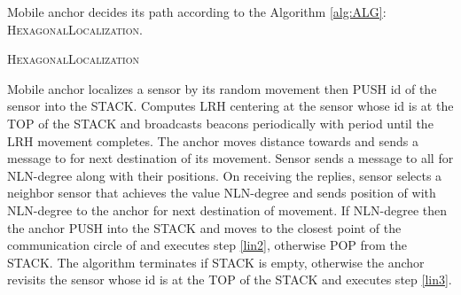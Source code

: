 \documentclass[preprint,11pt]{elsarticle}
\begin{document}
Mobile anchor decides its path according to the Algorithm \ref{alg:ALG}: \textsc{HexagonalLocalization}.
\begin{algorithm}[]
\caption{\textsc{HexagonalLocalization}}
\begin{algorithmic}[1]
                    \STATE Mobile anchor localizes a sensor by its random movement then PUSH id of the sensor into the STACK.
                    \STATE \label{lin2} Computes LRH centering at the sensor whose id  is at the TOP of the STACK and broadcasts beacons periodically with period  until the LRH movement completes.
                    \STATE \label{lin3} The anchor moves  distance towards  and sends a message to  for next destination of its movement.
                    \STATE Sensor  sends a message to all  for NLN-degree along with their positions.
                    \STATE On receiving the replies, sensor  selects
                        a neighbor sensor  that achieves the value NLN-degree and sends position of  with NLN-degree to the anchor for next destination of movement.
                    \STATE If NLN-degree then the anchor PUSH  into the STACK and moves to the closest point of the communication circle of  and executes step \ref{lin2}, otherwise POP from the STACK.
                    \STATE The algorithm terminates if STACK is empty, otherwise the anchor revisits the sensor whose id is at the TOP of the STACK and executes step \ref{lin3}.
\end{algorithmic}
\label{alg:ALG}
\end{algorithm}
\end{document}
